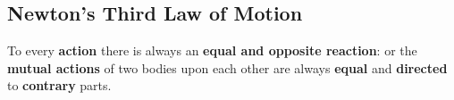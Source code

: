 \subsection{Newton's Third Law of Motion}
\begin{definition}
	To every {\bf action} there is always an {\bf equal and opposite reaction}: or the {\bf mutual actions} of two bodies upon each other are always {\bf equal} and {\bf directed} to {\bf contrary} parts.
\end{definition}

